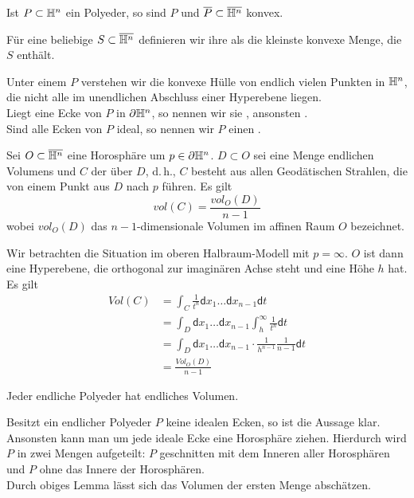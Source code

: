 \documentclass{book}
\renewcommand{\d}{\textsf{d}}
\begin{document}
\Bem{}
Ist $P \subset \mathbb{H}^n$ ein Polyeder, so sind $P$ und $\overline{P}\subset \overline{\mathbb{H}^n}$ konvex.

\Def{}
Für eine beliebige $S \subset \overline{\mathbb{H}^n}$ definieren wir ihre  als die kleinste konvexe Menge, die $S$ enthält.

\Def{}
Unter einem  $P$ verstehen wir die konvexe Hülle von endlich vielen Punkten in $\mathbb{H}^n$, die nicht alle im unendlichen Abschluss einer Hyperebene liegen.\\
Liegt eine Ecke von $P$ in $\partial \mathbb{H}^n$, so nennen wir sie , ansonsten .\\
Sind alle Ecken von $P$ ideal, so nennen wir $P$ einen .

\Lem{}
Sei $O \subset \overline{\mathbb{H}^n}$ eine Horosphäre um $p \in \partial \mathbb{H}^n$. $D \subset O$ sei eine Menge endlichen Volumens und $C$ der  über $D$, d.\,h., $C$ besteht aus allen Geodätischen Strahlen, die von einem Punkt aus $D$ nach $p$ führen. Es gilt
\[ vol(C) = \frac{vol_O(D)}{n-1} \]
wobei $vol_O(D)$ das $n-1$-dimensionale Volumen im affinen Raum $O$ bezeichnet.
\begin{Beweis}{}
	Wir betrachten die Situation im oberen Halbraum-Modell mit $p = \infty$. $O$ ist dann eine Hyperebene, die orthogonal zur imaginären Achse steht und eine Höhe $h$ hat. Es gilt
	\begin{align*}
	Vol(C) &= \int_{C} \frac{1}{t^n} \d x_1 \ldots \d x_{n-1} \d t\\
	&= \int_{D}\d x_1 \ldots \d x_{n-1} \int_{h}^{\infty} \frac{1}{t^n} \d t\\
		&= \int_{D}\d x_1 \ldots \d x_{n-1} \cdot \frac{1}{h^{n-1}} \frac{1}{n-1} \d t\\
	&= \frac{Vol_O(D)}{n-1}
	\end{align*}
\end{Beweis}

\Prop{}
Jeder endliche Polyeder hat endliches Volumen.
\begin{Beweis}{}
	Besitzt ein endlicher Polyeder $P$ keine idealen Ecken, so ist die Aussage klar. Ansonsten kann man um jede ideale Ecke eine Horosphäre ziehen. Hierdurch wird $P$ in zwei Mengen aufgeteilt: $P$ geschnitten mit dem Inneren aller Horosphären und $P$ ohne das Innere der Horosphären.\\
	Durch obiges Lemma lässt sich das Volumen der ersten Menge abschätzen.
\end{Beweis}
\end{document}
